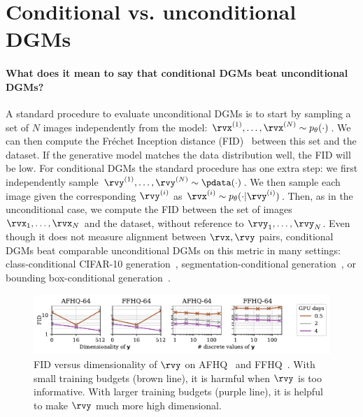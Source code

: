 
\section{Conditional vs. unconditional DGMs} \label{sec:cond-vs-uncond-dgms}
\paragraph{What does it mean to say that conditional DGMs beat unconditional DGMs?} A standard procedure to evaluate unconditional DGMs is to start by sampling a set of $N$ images independently from the model: ${\rvx^{(1)},\ldots,\rvx^{(N)} \sim p_\theta(\cdot)}$. We can then compute the Fr\'echet Inception distance (FID)~\citep{heusel2017gans} between this set and the dataset. If the generative model matches the data distribution well, the FID will be low.
%
For conditional DGMs the standard procedure has one extra step: we first independently sample ${\rvy^{(1)},\ldots,\rvy^{(N)} \sim \pdata(\cdot)}$. We then sample each image given the corresponding $\rvy^{(i)}$ as ${\rvx^{(i)} \sim p_\theta(\cdot|\rvy^{(i)})}$. 
%
Then, as in the unconditional case, we compute the FID between the set of images $\rvx_1,\ldots,\rvx_N$ and the dataset, without reference to $\rvy_1,\ldots,\rvy_N$. Even though it does not measure alignment between $\rvx, \rvy$ pairs, conditional DGMs beat comparable unconditional DGMs on this metric in many settings: class-conditional CIFAR-10 generation~\citep{karras2022elucidating}, segmentation-conditional generation~\citep{hu2022self}, or bounding box-conditional generation~\citep{hu2022self}.

\begin{figure}[t]
    \centering
    \includegraphics[width=\textwidth]{figs/2sdm/cond-results-vs-nclusters.pdf}
    \caption{FID versus dimensionality of $\rvy$ on AFHQ~\citep{choi2020stargan} and FFHQ~\citep{karras2018style}. With small training budgets (brown line), it is harmful when $\rvy$ is too informative. With larger training budgets (purple line), it is helpful to make $\rvy$ much more high dimensional.}
    \label{fig:fid-vs-ncomp}
\end{figure}


